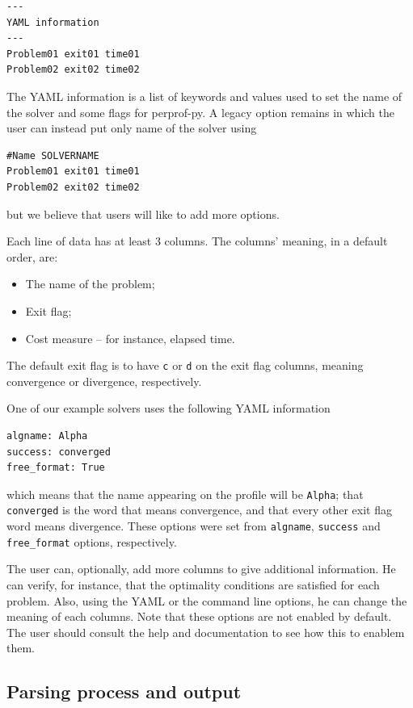     \begin{verbatim}
---
YAML information
---
Problem01 exit01 time01
Problem02 exit02 time02
    \end{verbatim}

    The YAML\cite{url:yaml,url:pyyaml} information is a list of keywords and values used to
    set the name of the solver and some
    flags for perprof-py.
    A legacy option remains in which the user can instead put only name of the
    solver using
\begin{verbatim}
#Name SOLVERNAME
Problem01 exit01 time01
Problem02 exit02 time02
\end{verbatim}
    but we believe that users will like to add more options.

    Each line of data has at least 3 columns.
    The columns' meaning, in a default order, are:
    \begin{itemize}
      \item The name of the problem;
      \item Exit flag;
      \item Cost measure -- for instance, elapsed time.
    \end{itemize}
    The default exit flag is to have {\tt c} or {\tt d} on the exit flag
    columns, meaning convergence or divergence, respectively.

    One of our example solvers uses the following YAML information
\begin{verbatim}
algname: Alpha
success: converged
free_format: True
\end{verbatim}
    which means that the name appearing on the profile will be {\tt Alpha};
    that {\tt converged} is the word that means convergence,
    and that every other exit flag word means divergence.
    These options were set from {\tt algname}, {\tt success} and {\tt
    free\_format} options, respectively.

    The user can, optionally, add more columns to give additional information.
    He can verify, for instance, that the optimality conditions are satisfied
    for each problem.
    Also, using the YAML or the command line options, he can change the
    meaning of each columns.
    Note that these options are not enabled by default. The user should consult
    the help and documentation to see how this to enablem them.

\subsection*{Parsing process and output}

